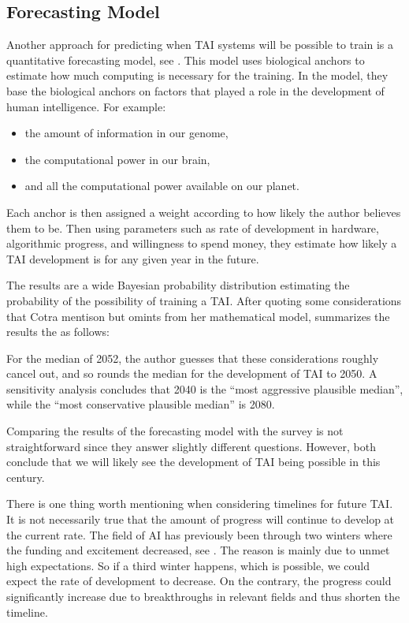 \documentclass[12pt,A4]{report}
\theoremstyle{definition}
\begin{document}
\subsection{Forecasting Model}
Another approach for predicting when TAI systems will be possible to train is a quantitative forecasting model, see \citet{Ajeya}. This model uses biological anchors to estimate how much computing is necessary for the training. In the model, they base the biological anchors on factors that played a role in the development of human intelligence. For example:
\begin{itemize}
  \item the amount of information in our genome, 
  \item the computational power in our brain,
  \item and all the computational power available on our planet. 
\end{itemize}
Each anchor is then assigned a weight according to how likely the author believes them to be. Then using parameters such as rate of development in hardware, algorithmic progress, and willingness to spend money, they estimate how likely a TAI development is for any given year in the future. 

The results are a wide Bayesian probability distribution estimating the probability of the possibility of training a TAI. After quoting some considerations that Cotra mentison but omints from her mathematical model, \citet{an121} summarizes the results the as follows:
\begin{displayquote}
For the median of 2052, the author guesses that these considerations roughly cancel out, and so rounds the median for the development of TAI to 2050. A sensitivity analysis concludes that 2040 is the “most aggressive plausible median”, while the “most conservative plausible median” is 2080.
\end{displayquote}
Comparing the results of the forecasting model with the survey is not straightforward since they answer slightly different questions. However, both conclude that we will likely see the development of TAI being possible in this century.

There is one thing worth mentioning when considering timelines for future TAI. It is not necessarily true that the amount of progress will continue to develop at the current rate. The field of AI has previously been through two winters where the funding and excitement decreased, see \citet[p.42]{RussellNorvig}. The reason is mainly due to unmet high expectations. So if a third winter happens, which is possible, we could expect the rate of development to decrease. On the contrary, the progress could significantly increase due to breakthroughs in relevant fields and thus shorten the timeline.
\end{document}

